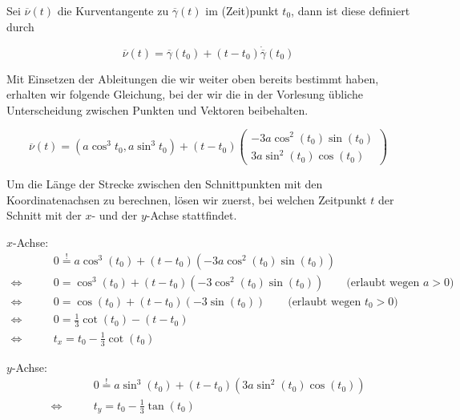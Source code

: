 \documentclass[a4paper,german,12pt,smallheadings]{scrartcl}
\begin{document}
Sei $\overline{\nu}(t)$ die Kurventangente zu $\overline{\gamma}(t)$ im
(Zeit)punkt $t_0$, dann ist diese definiert durch

\begin{equation*}
  \overline{\nu}(t) = \overline{\gamma}(t_0) + (t - t_0) \dot{\overline{\gamma}}(t_0)
\end{equation*}

Mit Einsetzen der Ableitungen die wir weiter oben bereits bestimmt haben,
erhalten wir folgende Gleichung, bei der wir die in der Vorlesung übliche
Unterscheidung zwischen Punkten und Vektoren beibehalten.

\begin{equation*}
  \overline{\nu}(t) = (a \cos^3 t_0, a \sin^3 t_0) + (t-t_0) \begin{pmatrix} -3a \cos^2(t_0) \sin(t_0) \\ 3a \sin^2(t_0) \cos(t_0) \end{pmatrix}
\end{equation*}

Um die Länge der Strecke zwischen den Schnittpunkten mit den Koordinatenachsen
zu berechnen, lösen wir zuerst, bei welchen Zeitpunkt $t$ der Schnitt mit der
$x$- und der $y$-Achse stattfindet.

$x$-Achse:
\begin{align*}
  &0 \overset{!}{=} a \cos^3(t_0) + (t-t_0)(-3a \cos^2(t_0) \sin(t_0)) \\
  \Leftrightarrow\qquad &0 = \cos^3(t_0) + (t-t_0)(-3 \cos^2(t_0) \sin(t_0)) \qquad \text{(erlaubt wegen $a>0$)}\\
  \Leftrightarrow\qquad &0 = \cos(t_0) + (t-t_0)(-3 \sin(t_0)) \qquad \text{(erlaubt wegen $t_0 > 0$)}\\
  \Leftrightarrow\qquad &0 = \frac{1}{3} \cot(t_0) - (t - t_0) \\
  \Leftrightarrow\qquad &t_x = t_0 - \frac{1}{3} \cot(t_0)
\end{align*}

$y$-Achse:
\begin{align*}
  &0 \overset{!}{=} a \sin^3(t_0) + (t-t_0)(3a \sin^2(t_0) \cos(t_0)) \\
  \Leftrightarrow\qquad &t_y = t_0 - \frac{1}{3} \tan(t_0)
\end{align*}
\end{document}
